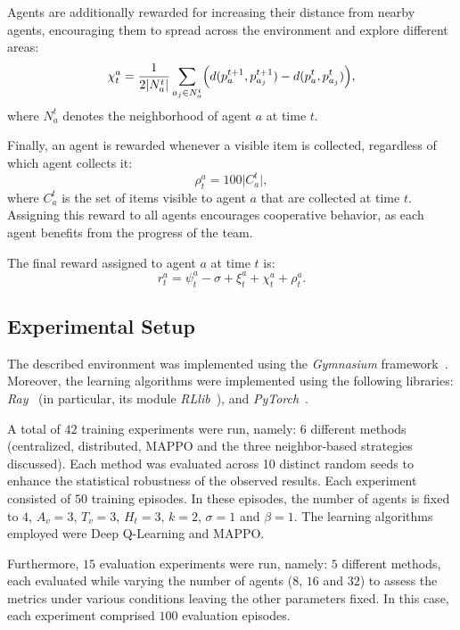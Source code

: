 Agents are additionally rewarded for increasing their distance
from nearby agents,
encouraging them to spread across the environment
and explore different areas:
%
\begin{equation}
\chi_t^a =
\frac{1}{2\lvert N_a^t\rvert}
\sum_{a_j \in N_a^t}
\Bigl(
    d(p_a^{t+1}, p_{a_j}^{t+1})
    -
    d(p_a^t, p_{a_j}^t)
\Bigr),
\end{equation}
%
where $N_a^t$ denotes the neighborhood of agent $a$
at time $t$.

Finally,
an agent is rewarded whenever a visible item is collected,
regardless of which agent collects it:
%
\begin{equation}
\rho_t^a = 100 \lvert C_a^t \rvert,
\end{equation}
%
where $C_a^t$ is the set of items visible to agent $a$
that are collected at time $t$.
%
Assigning this reward to all agents encourages cooperative behavior,
as each agent benefits from the progress of the team.

The final reward assigned to agent $a$ at time $t$ is:
%
\begin{equation}
r_t^a =
\psi_t^a
-
\sigma
+
\xi_t^a
+
\chi_t^a
+
\rho_t^a.
\end{equation}

\subsection{Experimental Setup}
The described environment was implemented using 
 the \emph{Gymnasium} framework~\cite{DBLP:journals/corr/abs-2407-17032}.
%
Moreover, 
 the learning algorithms were implemented using the following libraries: 
 \emph{Ray}~\cite{DBLP:conf/osdi/MoritzNWTLLEYPJ18} 
 (in particular, its module \emph{RLlib}~\cite{DBLP:conf/icml/LiangLNMFGGJS18}),
 and \emph{PyTorch}~\cite{DBLP:conf/nips/PaszkeGMLBCKLGA19}.

A total of $42$ training experiments were run, namely: 
 $6$ different methods (centralized, distributed, MAPPO and the three neighbor-based strategies discussed).
%
Each method was evaluated across 10 distinct random seeds 
 to enhance the statistical robustness of the observed results.
%
Each experiment consisted of $50$ training episodes. 
%
In these episodes, 
 the number of agents is fixed to $4$, $A_v = 3$, $T_v = 3$, $H_t = 3$, $k = 2$, $\sigma = 1$ and $\beta = 1$.
%
The learning algorithms employed were Deep Q-Learning and MAPPO.

Furthermore, $15$ evaluation experiments were run, namely: 
 $5$ different methods, each evaluated while varying the number of agents ($8$, $16$ and $32$) 
 to assess the metrics under various conditions leaving the other parameters fixed.
% 
In this case, 
 each experiment comprised $100$ evaluation episodes.


